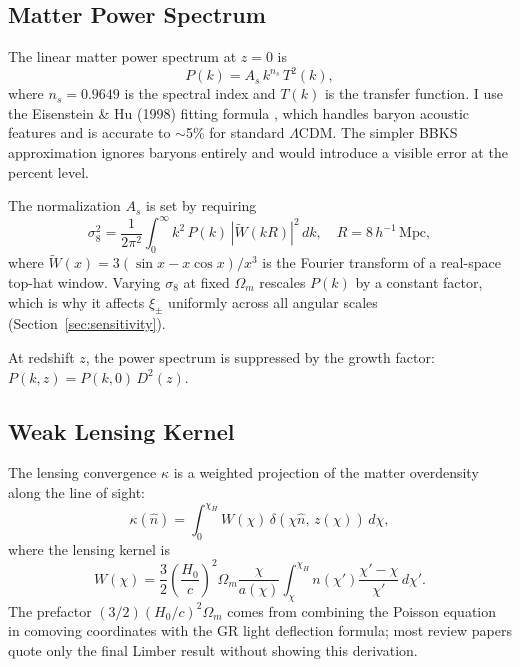 \documentclass[12pt, a4paper]{article}
\begin{document}
\subsection{Matter Power Spectrum}
 
The linear matter power spectrum at $z=0$ is
\begin{equation}
    P(k) = A_s\, k^{n_s}\, T^2(k),
\end{equation}
where $n_s = 0.9649$ is the spectral index \citep{Aghanim2020} and $T(k)$ is
the transfer function. I use the Eisenstein \& Hu (1998) fitting formula
\citep{EisensteinHu1998}, which handles baryon acoustic features and is accurate
to $\sim$5\% for standard $\Lambda$CDM. The simpler BBKS approximation ignores
baryons entirely and would introduce a visible error at the percent level.
 
The normalization $A_s$ is set by requiring
\begin{equation}
    \sigma_8^2 = \frac{1}{2\pi^2}\int_0^\infty k^2\,P(k)\,|\tilde{W}(kR)|^2\,dk,
    \quad R = 8\,h^{-1}\,\mathrm{Mpc},
\end{equation}
where $\tilde{W}(x) = 3(\sin x - x\cos x)/x^3$ is the Fourier transform of a
real-space top-hat window. Varying $\sigma_8$ at fixed $\Omega_m$ rescales
$P(k)$ by a constant factor, which is why it affects $\xi_\pm$ uniformly across
all angular scales (Section~\ref{sec:sensitivity}).
 
At redshift $z$, the power spectrum is suppressed by the growth factor:
$P(k,z) = P(k,0)\,D^2(z)$.
 
\subsection{Weak Lensing Kernel}
 
The lensing convergence $\kappa$ is a weighted projection of the matter overdensity
along the line of sight:
\begin{equation}
    \kappa(\hat{n}) = \int_0^{\chi_H} W(\chi)\,\delta(\chi\hat{n},\,z(\chi))\,d\chi,
\end{equation}
where the lensing kernel is
\begin{equation}
    W(\chi) = \frac{3}{2}\left(\frac{H_0}{c}\right)^2\Omega_m
    \frac{\chi}{a(\chi)}\int_\chi^{\chi_H}
    n(\chi')\frac{\chi'-\chi}{\chi'}\,d\chi'.
    \label{eq:kernel}
\end{equation}
The prefactor $(3/2)(H_0/c)^2\Omega_m$ comes from combining the Poisson equation
in comoving coordinates with the GR light deflection formula; most review papers
quote only the final Limber result without showing this derivation.
 
\end{document}
